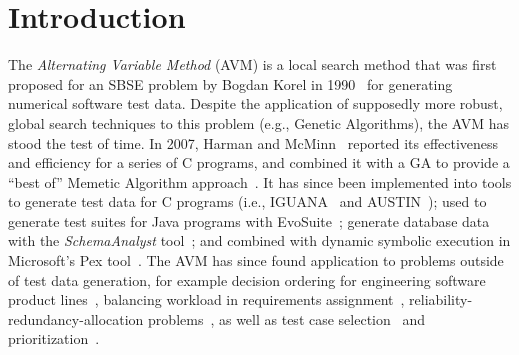 \documentclass{llncs}
\newcommand{\AVM}{Alternating Variable Method\xspace}
\begin{document}
\section{Introduction}
\vspace{-1em}
The {\it \AVM\/} (AVM) is a local search method that was first proposed for an SBSE problem by Bogdan Korel in 1990~\cite{Korel1990}
for generating \mbox{numerical} software test data.
Despite the application of supposedly more robust, global search techniques to this problem (e.g., Genetic Algorithms), the AVM has stood the test of time. In 2007, Harman and McMinn~\cite{Harman2007} reported its effectiveness and efficiency for a series of C programs, and combined it with a GA to provide a ``best of'' Memetic Algorithm approach~\cite{Harman2010}. It has since been implemented into tools to generate test data for C programs (i.e., IGUANA~\cite{McMinn2007} and AUSTIN~\cite{Lakhotia2010,Lakhotia2013}); used to generate test suites for Java programs with {\sc EvoSuite}~\cite{Fraser2013,Fraser2015b}; generate database data with the {\it SchemaAnalyst\/} tool~\cite{Kapfhammer2013,McMinn2015}; and combined with dynamic symbolic execution in Microsoft's Pex tool~\cite{Lakhotia2010b}.
The AVM has since found application to problems outside of test data generation, for example
%
decision ordering for engineering software product lines~\cite{Yue2016}, %
%
balancing workload in requirements assignment~\cite{Yue2014}, %
%
reliability-redundancy-allocation problems~\cite{Qiu2016}, %
%
as well as test case selection~\cite{Pradhan2016} and prioritization~\cite{Arrieta2016}. %
\end{document}
